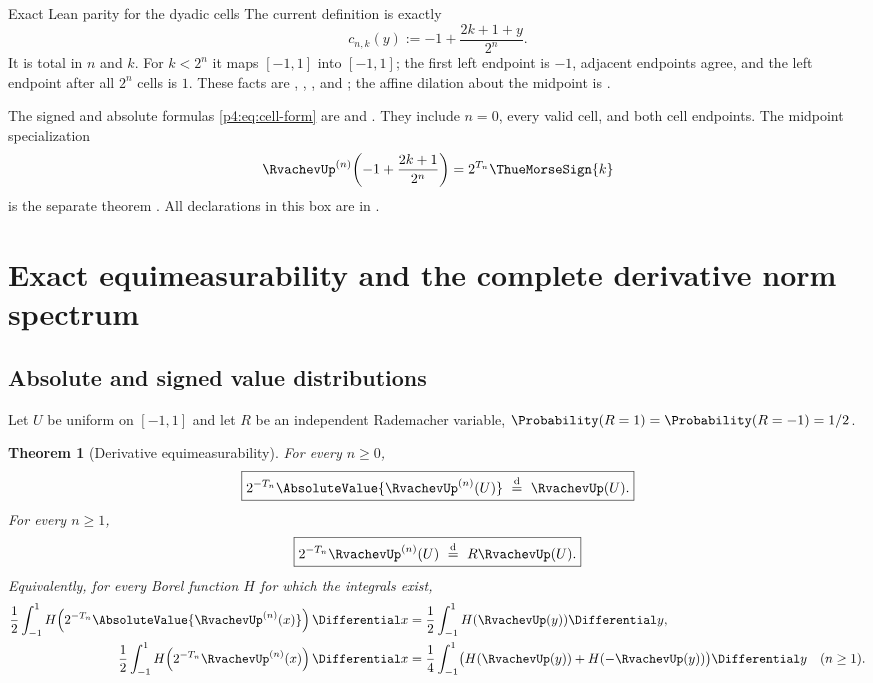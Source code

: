 \documentclass[11pt,oneside]{article}
\newtheorem{theorem}{Theorem}[section]
\theoremstyle{definition}
\theoremstyle{remark}
\begin{document}
\begin{statusbox}{Exact Lean parity for the dyadic cells}
The current definition
 is exactly
\[
 c_{n,k}(y):=-1+\frac{2k+1+y}{2^n}.
\]
It is total in \(n\) and \(k\).  For \(k<2^n\) it maps \([-1,1]\) into \([-1,1]\);
the first left endpoint is \(-1\), adjacent endpoints agree, and the left endpoint after
all \(2^n\) cells is \(1\).  These facts are
,
,
, and
; the affine dilation about the midpoint is
.

The signed and absolute formulas \eqref{p4:eq:cell-form} are
 and
.  They include \(n=0\), every valid cell, and both
cell endpoints.  The midpoint specialization
\[
 \RvachevUp^{(n)}\!\left(-1+\frac{2k+1}{2^n}\right)
 =2^{T_n}\ThueMorseSign{k}
\]
is the separate theorem .  All declarations in this
box are in .
\end{statusbox}

\section{Exact equimeasurability and the complete derivative norm spectrum}
\label{p4:sec:equimeasurability}

\subsection{Absolute and signed value distributions}

Let $U$ be uniform on $[-1,1]$ and let $R$ be an independent Rademacher variable,
$\Probability(R=1)=\Probability(R=-1)=1/2$.

\begin{theorem}[Derivative equimeasurability]
\label{p4:thm:equimeasurable}
For every $n\geq0$,
\begin{equation}
 \boxed{
 2^{-T_n}\AbsoluteValue{\RvachevUp^{(n)}(U)}\ \overset{\mathrm d}=\ \RvachevUp(U).}
 \label{p4:eq:absolute-equimeasurable}
\end{equation}
For every $n\geq1$,
\begin{equation}
 \boxed{
 2^{-T_n}\RvachevUp^{(n)}(U)\ \overset{\mathrm d}=\ R\RvachevUp(U).}
 \label{p4:eq:signed-equimeasurable}
\end{equation}
Equivalently, for every Borel function $H$ for which the integrals exist,
\begin{align}
 \frac12\int_{-1}^{1}H\!\left(2^{-T_n}\AbsoluteValue{\RvachevUp^{(n)}(x)}\right)\Differential x
 &=\frac12\int_{-1}^{1}H(\RvachevUp(y))\Differential y,\label{p4:eq:H-absolute}\\
 \frac12\int_{-1}^{1}H\!\left(2^{-T_n}\RvachevUp^{(n)}(x)\right)\Differential x
 &=\frac14\int_{-1}^{1}\bigl(H(\RvachevUp(y))+H(-\RvachevUp(y))\bigr)\Differential y
 \quad(n\geq1).
 \label{p4:eq:H-signed}
\end{align}
\end{theorem}
\end{document}
